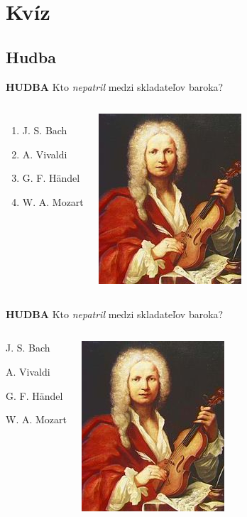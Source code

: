 \documentclass[dvipsnames]{beamer}
\begin{document}
\section{Kvíz}
\frame{\sectionpage}
\begin{frame}
	\subsection{Hudba}
	\textbf{HUDBA}
	\vskip 3mm
	Kto \textit{nepatril} medzi skladateľov baroka?
	\begin{columns}
	\begin{enumerate}
		\item J. S. Bach
		\item A. Vivaldi
		\item G. F. Händel
		\item W. A. Mozart
	\end{enumerate}
		\includegraphics[scale=1.75]{vivaldi}

	\end{columns}
\end{frame}
\begin{frame}
	\textbf{HUDBA}
	\vskip 3mm
	Kto \textit{nepatril} medzi skladateľov baroka?
	\begin{columns}
	\column{0.5\textwidth}

	\begin{enumerate}
		\item J. S. Bach
		\item A. Vivaldi
		\item G. F. Händel
		\textcolor{g}{\item[\textcolor{g}{4.}] W. A. Mozart}
	\end{enumerate}
	\column{0.5\textwidth}
		\includegraphics[scale=1.75]{vivaldi}

	\end{columns}

\end{frame}
\end{document}
